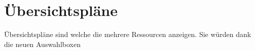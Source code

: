 \chapter{Übersichtspläne}

Übersichtspläne sind welche die mehrere Ressourcen anzeigen. Sie würden dank die neuen Auswahlboxen 